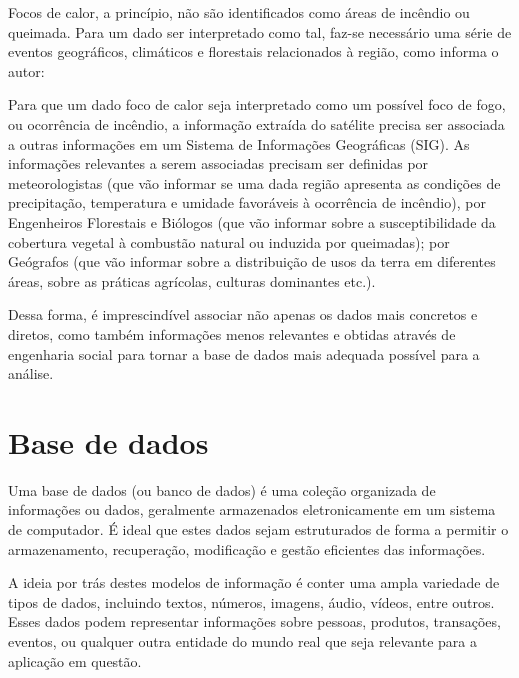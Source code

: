Focos de calor, a princípio, não são identificados como áreas de incêndio ou queimada. Para um dado ser interpretado como tal, faz-se necessário uma série de eventos geográficos, climáticos e florestais relacionados à região, como informa o autor:

\noindent
\begin{quoting}[rightmargin=0cm,leftmargin=4cm]
\begin{singlespace}
{\footnotesize
Para que um dado foco de calor seja interpretado como um possível foco de fogo, ou ocorrência de incêndio, a informação extraída do satélite precisa ser associada a outras informações em um Sistema de Informações Geográficas (SIG). As informações relevantes a serem associadas precisam ser definidas por meteorologistas (que vão informar se uma dada região apresenta as condições de precipitação, temperatura e umidade favoráveis à ocorrência de incêndio), por Engenheiros Florestais e Biólogos (que vão informar sobre a susceptibilidade da cobertura vegetal à combustão natural ou induzida por queimadas); por Geógrafos (que vão informar sobre a distribuição de usos da terra em diferentes áreas, sobre as práticas agrícolas, culturas dominantes etc.). \cite[p. 32]{novo10}
}
\end{singlespace}
\end{quoting}

Dessa forma, é imprescindível associar não apenas os dados mais concretos e diretos, como também informações menos relevantes e obtidas através de engenharia social para tornar a base de dados mais adequada possível para a análise.

\section{Base de dados}

Uma base de dados (ou banco de dados) é uma coleção organizada de informações ou dados, geralmente armazenados eletronicamente em um sistema de computador. É ideal que estes dados sejam estruturados de forma a permitir o armazenamento, recuperação, modificação e gestão eficientes das informações.

A ideia por trás destes modelos de informação é conter uma ampla variedade de tipos de dados, incluindo textos, números, imagens, áudio, vídeos, entre outros. Esses dados podem representar informações sobre pessoas, produtos, transações, eventos, ou qualquer outra entidade do mundo real que seja relevante para a aplicação em questão.

